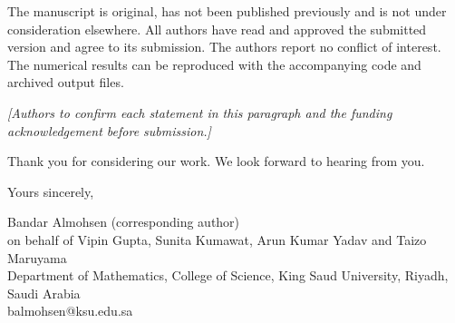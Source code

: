 \documentclass[10.5pt,a4paper]{article}
\begin{document}
The manuscript is original, has not been published previously and is not under consideration elsewhere. All authors have read and approved the submitted version and agree to its submission. The authors report no conflict of interest. The numerical results can be reproduced with the accompanying code and archived output files.

\textit{[Authors to confirm each statement in this paragraph and the funding acknowledgement before submission.]}

Thank you for considering our work. We look forward to hearing from you.

\medskip
Yours sincerely,

\medskip
Bandar Almohsen (corresponding author)\\
on behalf of Vipin Gupta, Sunita Kumawat, Arun Kumar Yadav and Taizo Maruyama\\
Department of Mathematics, College of Science, King Saud University, Riyadh, Saudi Arabia\\
balmohsen@ksu.edu.sa
\end{document}
